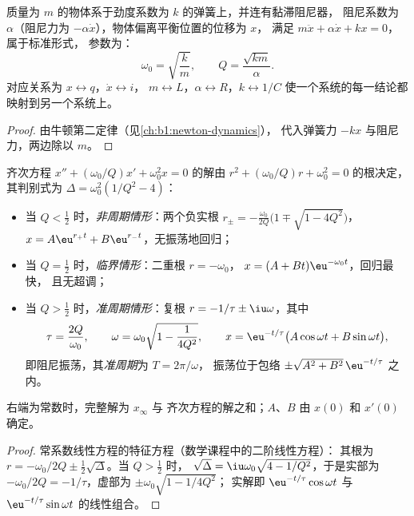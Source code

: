 \begin{proposition}[机械振子]\label{prop:b1:transient-regimes:mechanical}
质量为 $m$ 的物体系于劲度系数为 $k$ 的弹簧上，并连有黏滞阻尼器，
阻尼系数为 $\alpha$（阻尼力为 $-\alpha\dot x$），物体偏离平衡位置的位移为 $x$，
满足 $m\ddot x + \alpha\dot x + kx = 0$，属于标准形式，
参数为：
\[
\omega_0 = \sqrt{\frac{k}{m}}, \qquad Q = \frac{\sqrt{km}}{\alpha} .
\]
对应关系为 $x \leftrightarrow q$，$\dot x \leftrightarrow i$，
$m \leftrightarrow L$，$\alpha \leftrightarrow R$，$k \leftrightarrow 1/C$
使一个系统的每一结论都映射到另一个系统上。
\end{proposition}

\begin{proof}
由牛顿第二定律（见\cref{ch:b1:newton-dynamics}），
代入弹簧力 $-kx$ 与阻尼力，两边除以 $m$。
\end{proof}

\begin{theorem}[三种情形]\label{thm:b1:transient-regimes:regimes}
齐次方程 $x'' + (\omega_0/Q)x' +
\omega_0^2 x = 0$ 的解由 $r^2 + (\omega_0/Q)r +
\omega_0^2 = 0$ 的根决定，其判别式为 $\Delta = \omega_0^2(1/Q^2 - 4)$：
\begin{itemize}
  \item 当 $Q < \tfrac12$ 时，\emph{非周期情形}：两个负实根
        $r_\pm = -\frac{\omega_0}{2Q}\big(1 \mp \sqrt{1 - 4Q^2}\big)$，
        $x = A\eu^{r_+t} + B\eu^{r_-t}$，无振荡地回归；
  \item 当 $Q = \tfrac12$ 时，\emph{临界情形}：二重根 $r = -\omega_0$，
        $x = (A + Bt)\eu^{-\omega_0 t}$，回归最快，
        且无超调；
  \item 当 $Q > \tfrac12$ 时，\emph{准周期情形}：复根
        $r = -1/\tau \pm \iu\omega$，其中
        \[
        \tau = \frac{2Q}{\omega_0}, \qquad
        \omega = \omega_0\sqrt{1 - \frac{1}{4Q^2}},
        \qquad
        x = \eu^{-t/\tau}\big(A\cos\omega t + B\sin\omega t\big),
        \]
        即阻尼振荡，其\emph{准周期}为 $T = 2\pi/\omega$，
        振荡位于包络 $\pm\sqrt{A^2 + B^2}\,\eu^{-t/\tau}$ 之内。
\end{itemize}
右端为常数时，完整解为 $x_\infty$ 与
齐次方程的解之和；$A$、$B$ 由 $x(0)$ 和 $x'(0)$ 确定。
\end{theorem}

\begin{proof}
常系数线性方程的特征方程（数学课程中的二阶线性方程）：
其根为
$r = -\omega_0/2Q \pm \tfrac12\sqrt\Delta$。当 $Q > \tfrac12$ 时，
$\sqrt\Delta = \iu\omega_0\sqrt{4 - 1/Q^2}$，于是实部为
$-\omega_0/2Q = -1/\tau$，虚部为 $\pm\omega_0\sqrt{1 - 1/4Q^2}$；
实解即 $\eu^{-t/\tau}\cos\omega t$ 与
$\eu^{-t/\tau}\sin\omega t$ 的线性组合。
\end{proof}


